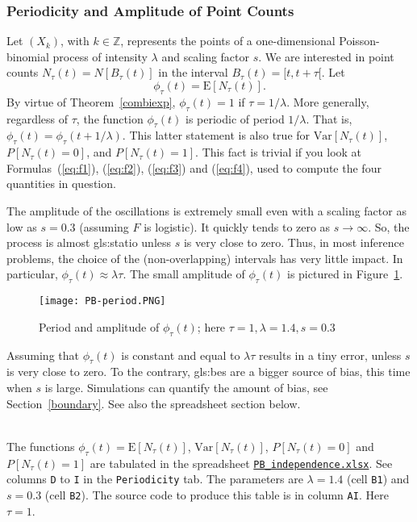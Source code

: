 \documentclass[10pt]{article}
\begin{document}
\subsubsection{Periodicity and Amplitude of Point Counts}\label{bbei}

Let  $(X_k)$, with $k\in\mathbb{Z}$, represents the points of a one-dimensional Poisson-binomial process of intensity $\lambda$ and scaling factor $s$. We are interested in point counts
$N_\tau(t)=N[B_\tau(t)]$ in  the interval $B_\tau(t)=[t, t+\tau[$. Let
 $$\phi_\tau(t) = \mbox{E}[N_\tau(t)].$$
By virtue of
Theorem~\ref{combiexp}, $\phi_\tau(t)=1$ if $\tau=1/\lambda$. More generally, regardless of $\tau$, the function $\phi_\tau(t)$ is periodic of
period $1/\lambda$. That is, $\phi_\tau(t)=\phi_\tau(t+1/\lambda)$. This latter statement is also true
for $\mbox{Var}[N_\tau(t)]$, $P[N_\tau(t)=0]$, and $P[N_\tau(t)=1]$. This fact is trivial if you look at Formulas~(\ref{eq:f1}), (\ref{eq:f2}), (\ref{eq:f3}) and (\ref{eq:f4}),
 used to compute the four quantities in question.

The amplitude of the oscillations is extremely small even with a scaling factor as low as $s=0.3$ (assuming $F$ is logistic). It quickly tends to zero as $s\rightarrow\infty$. So,
the process is almost \gls{gls:statio} unless $s$ is very close to zero. Thus, in most inference problems, the choice of the (non-overlapping) intervals has very little impact. In particular, $\phi_\tau(t)\approx \lambda\tau$. The small amplitude of $\phi_\tau(t)$ is pictured in Figure~\ref{fig:pbperiod}.

\begin{figure}[H]
\centering
\texttt{[image: PB-period.PNG]}
\caption{Period and amplitude of $\phi_\tau(t)$; here $\tau=1,\lambda=1.4, s=0.3$}
\label{fig:pbperiod}
\end{figure}

Assuming that $\phi_\tau(t)$ is constant and equal to $\lambda\tau$ results in a tiny error, unless $s$ is very close to zero. To the contrary,
\glspl{gls:be} are a bigger source of bias, this time when $s$ is large. Simulations can quantify the amount of bias, see Section~\ref{boundary}. See also
the spreadsheet section below.\\
\quad \\

\noindent The functions $\phi_\tau(t)=\mbox{E}[N_\tau(t)]$, $\mbox{Var}[N_\tau(t)]$, $P[N_\tau(t)=0]$ and $P[N_\tau(t)=1]$ are tabulated in the spreadsheet
 \href{https://github.com/VincentGranville/Point-Processes/tree/main/Spreadsheets}{\texttt{PB\_independence.xlsx}}. See columns \texttt{D} to \texttt{I} in the \texttt{Periodicity} tab.
The parameters are $\lambda=1.4$ (cell \texttt{B1}) and $s=0.3$ (cell \texttt{B2}). The source code to produce this table is in column \texttt{AI}. Here $\tau=1$.
\end{document}
